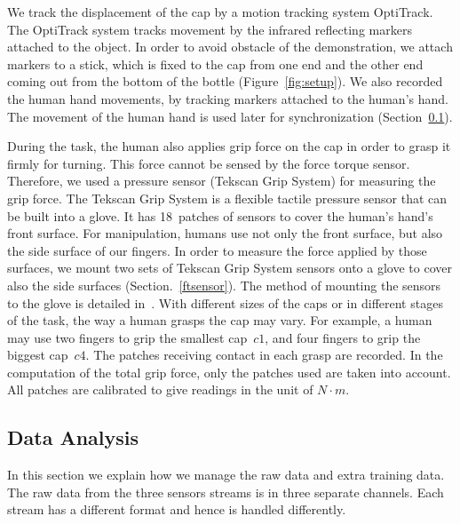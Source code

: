 We track the displacement of the cap by a motion tracking system
OptiTrack. The OptiTrack system tracks movement by the infrared
reflecting markers attached to the object. In order to avoid obstacle
of the demonstration, we attach markers to a stick, which is fixed to
the cap from one end and the other end coming out from the bottom of
the bottle (Figure~\ref{fig:setup}). We also recorded the human hand
movements, by tracking markers attached to the human's hand. The
movement of the human hand is used later for synchronization
(Section~\ref{dataanalysis}).

During the task, the human also applies grip force on the cap in order
to grasp it firmly for turning. This force cannot be sensed by the
force torque sensor. Therefore, we used a pressure sensor (Tekscan
Grip System) for measuring the grip force. The Tekscan Grip System is
a flexible tactile pressure sensor that can be built into a glove. It
has 18~patches of sensors to cover the human's hand's front
surface. For manipulation, humans use not only the front surface, but
also the side surface of our fingers. In order to measure the force
applied by those surfaces, we mount two sets of Tekscan Grip System
sensors onto a glove to cover also the side surfaces
(Section.~\ref{ftsensor}). The method of mounting the sensors to the glove
is detailed in~\citep{deSouza2014}. With different sizes of the caps
or in different stages of the task, the way a human grasps the cap may
vary.  For example, a human may use two fingers to grip the smallest
cap~$c1$, and four fingers to grip the biggest cap~$c4$. The patches
receiving contact in each grasp are recorded. In the computation of
the total grip force, only the patches used are taken into
account. All patches are calibrated to give readings in the unit of
$N{\cdot}m$.


\subsection{Data Analysis}
\label{dataanalysis}
In this section we explain how we manage the raw data and extra
training data.  The raw data from the three sensors streams is in
three separate channels. Each stream has a different format and hence
is handled differently.

